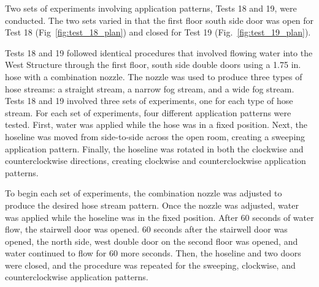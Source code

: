 \documentclass[12pt,oneside]{book}
\begin{document}
Two sets of experiments involving application patterns, Tests 18 and 19, were conducted. The two sets varied in that the first floor south side door was open for Test 18 (Fig~\ref{fig:test_18_plan}) and closed for Test 19 (Fig.~\ref{fig:test_19_plan}).

Tests 18 and 19 followed identical procedures that involved flowing water into the West Structure through the first floor, south side double doors using a 1.75 in. hose with a combination nozzle. The nozzle was used to produce three types of hose streams: a straight stream, a narrow fog stream, and a wide fog stream. Tests 18 and 19 involved three sets of experiments, one for each type of hose stream. For each set of experiments, four different application patterns were tested. First, water was applied while the hose was in a fixed position. Next, the hoseline was moved from side-to-side across the open room, creating a sweeping application pattern. Finally, the hoseline was rotated in both the clockwise and counterclockwise directions, creating clockwise and counterclockwise application patterns. 

To begin each set of experiments, the combination nozzle was adjusted to produce the desired hose stream pattern. Once the nozzle was adjusted, water was applied while the hoseline was in the fixed position. After 60 seconds of water flow, the stairwell door was opened. 60 seconds after the stairwell door was opened, the north side, west double door on the second floor was opened, and water continued to flow for 60 more seconds. Then, the hoseline and two doors were closed, and the procedure was repeated for the sweeping, clockwise, and counterclockwise application patterns.
\end{document}
